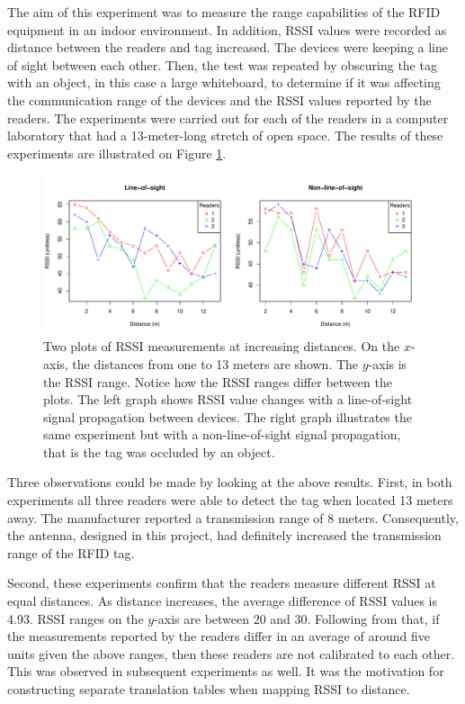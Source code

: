 The aim of this experiment was to measure the range capabilities of the RFID equipment in an indoor environment. In addition, RSSI values were recorded as distance between the readers and tag increased. The devices were keeping a line of sight between each other. Then, the test was repeated by obscuring the tag with an object, in this case a large whiteboard, to determine if it was affecting the communication range of the devices and the RSSI values reported by the readers. The experiments were carried out for each of the readers in a computer laboratory that had a 13-meter-long stretch of open space. The results of these experiments are illustrated on Figure \ref{fig:13m}.

\begin{figure}[h]
	\begin{center}
		\includegraphics[width=1\textwidth]{figures/rssi_distance_13m}
		\caption{Two plots of RSSI measurements at increasing distances. On the $x$-axis, the distances from one to 13 meters are shown. The $y$-axis is the RSSI range. Notice how the RSSI ranges differ between the plots. The left graph shows RSSI value changes with a line-of-sight signal propagation between devices. The right graph illustrates the same experiment but with a non-line-of-sight signal propagation, that is the tag was occluded by an object.}
		\label{fig:13m}
	\end{center}
\end{figure}

Three observations could be made by looking at the above results. First, in both experiments all three readers were able to detect the tag when located 13 meters away. The manufacturer reported a transmission range of 8 meters. Consequently, the antenna, designed in this project, had definitely increased the transmission range of the RFID tag. 

Second, these experiments confirm that the readers measure different RSSI at equal distances. As distance increases, the average difference of RSSI values is 4.93. RSSI ranges on the $y$-axis are between 20 and 30. Following from that, if the measurements reported by the readers differ in an average of around five units given the above ranges, then these readers are not calibrated to each other. This was observed in subsequent experiments as well. It was the motivation for constructing separate translation tables when mapping RSSI to distance.

